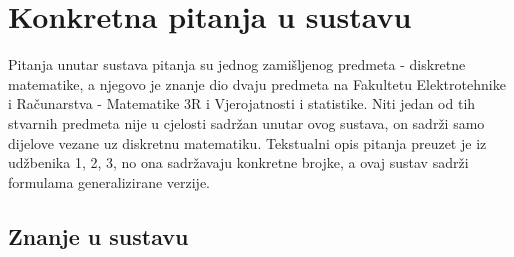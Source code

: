 \documentclass[times, utf8, zavrsni, numeric]{fer}
\begin{document}
\section{Konkretna pitanja u sustavu}
Pitanja unutar sustava pitanja su jednog zamišljenog predmeta - diskretne matematike, a njegovo je znanje dio dvaju predmeta na Fakultetu Elektrotehnike i Računarstva - Matematike 3R i Vjerojatnosti i statistike. Niti jedan od tih stvarnih predmeta nije u cjelosti sadržan unutar ovog sustava, on sadrži samo dijelove vezane uz diskretnu matematiku. Tekstualni opis pitanja preuzet je iz udžbenika 1, 2, 3, no ona sadržavaju konkretne brojke, a ovaj sustav sadrži formulama generalizirane verzije.

\subsection{Znanje u sustavu}
\end{document}
